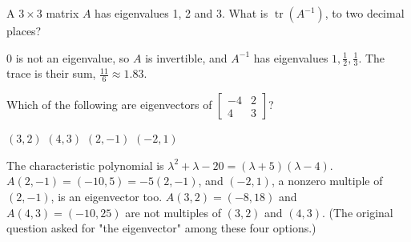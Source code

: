 \begin{question}[id=eig-20, marks=2]
A $3 \times 3$ matrix $A$ has eigenvalues 1, 2 and 3. What is $\operatorname{tr}(A^{-1})$, to two decimal places?
\begin{solution}
0 is not an eigenvalue, so $A$ is invertible, and $A^{-1}$ has eigenvalues $1, \frac{1}{2}, \frac{1}{3}$. The trace is their sum, $\frac{11}{6} \approx 1.83$.
\end{solution}
\end{question}


\begin{question}[id=gate-ec2005-3, type=msq, source=GATE EC 2005 (adapted), marks=2]
Which of the following are eigenvectors of $\begin{bmatrix} -4 & 2 \\ 4 & 3 \end{bmatrix}$?
\begin{options}
  \option $(3, 2)$
  \option $(4, 3)$
  \correct $(2, -1)$
  \correct $(-2, 1)$
\end{options}
\begin{solution}
The characteristic polynomial is $\lambda^2 + \lambda - 20 = (\lambda + 5)(\lambda - 4)$. $A(2, -1) = (-10, 5) = -5(2, -1)$, and $(-2, 1)$, a nonzero multiple of $(2, -1)$, is an eigenvector too. $A(3, 2) = (-8, 18)$ and $A(4, 3) = (-10, 25)$ are not multiples of $(3, 2)$ and $(4, 3)$. (The original question asked for "the eigenvector" among these four options.)
\end{solution}
\end{question}

